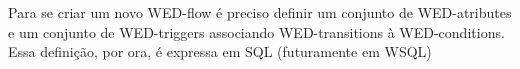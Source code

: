       
  

 
  Para se criar um novo WED-flow é preciso definir um conjunto de WED-atributes e um conjunto de WED-triggers associando
WED-transitions à WED-conditions. Essa definição, por ora, é expressa em SQL (futuramente em WSQL)
  
  


 





  

 
    
